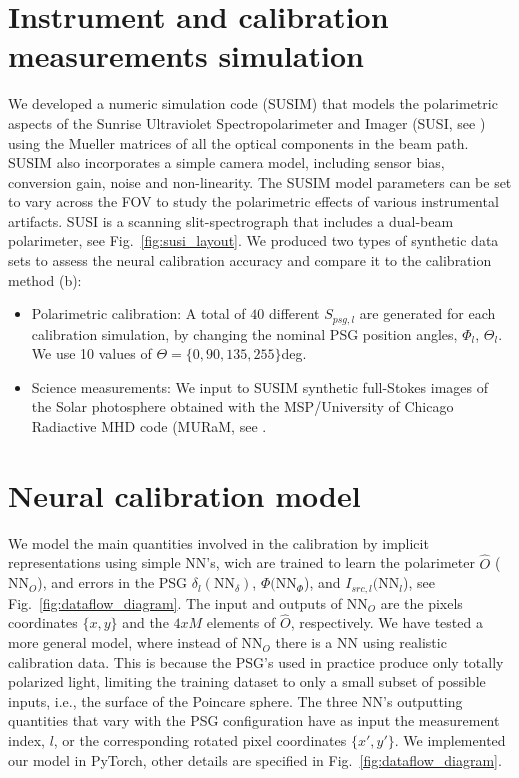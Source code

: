 \documentclass[baaa]{baaa}
\begin{document}
\section{Instrument and calibration measurements simulation}

We developed a numeric simulation code {\sc(SUSIM)} that models the polarimetric aspects of the Sunrise Ultraviolet Spectropolarimeter and Imager (SUSI, see \citealt{Feller2020}) using the Mueller matrices of all the optical components in the beam path. {\sc SUSIM} also incorporates a simple camera model, including sensor bias, conversion gain, noise and non-linearity. The {\sc SUSIM} model parameters can be set to vary across the FOV to study the polarimetric effects of various instrumental artifacts. SUSI is a scanning slit-spectrograph that includes a dual-beam polarimeter, see Fig.~\ref{fig:susi_layout}. We produced two types of synthetic data sets to assess the neural calibration accuracy and compare it to the calibration method (b):

\begin{itemize}
    \item Polarimetric calibration: A total of $40$ different $S_{psg,l}$ are generated for each calibration simulation, by changing the nominal PSG position angles, $\Phi_l$, $\Theta_l$. We use 10 values of $\Theta=\{0,90,135,255\}$deg.\\
    \item Science measurements: We input to SUSIM synthetic full-Stokes images of the Solar photosphere obtained with the MSP/University of Chicago Radiactive MHD code (MURaM, see \citep{Przybylski2022}.
\end{itemize}



\section{Neural calibration model}

We model the main quantities involved in the calibration by implicit representations using simple NN's, wich are trained to learn the polarimeter $\hat{O}$ ($\text{NN}_O$), and errors in the PSG $\delta_l (\text{NN}_\delta)$, $\Phi (\text{NN}_\Phi$), and $I_{src,l} (\text{NN}_l$), see Fig.~\ref{fig:dataflow_diagram}. The input and outputs of $\text{NN}_O$ are the pixels coordinates $\{x,y\}$ and the $4xM$ elements of $\hat{O}$, respectively. We have tested a more general model, where instead of $\text{NN}_O$ there is a NN using realistic calibration data. This is because the PSG's used in practice produce only totally polarized light, limiting the training dataset to only a small subset of possible inputs, i.e., the surface of the Poincare sphere. The three NN's outputting quantities that vary with the PSG configuration have as input the measurement index, $l$, or the corresponding rotated pixel coordinates $\{x',y'\}$. We implemented our model in PyTorch, other details are specified in Fig.~\ref{fig:dataflow_diagram}.
\end{document}
